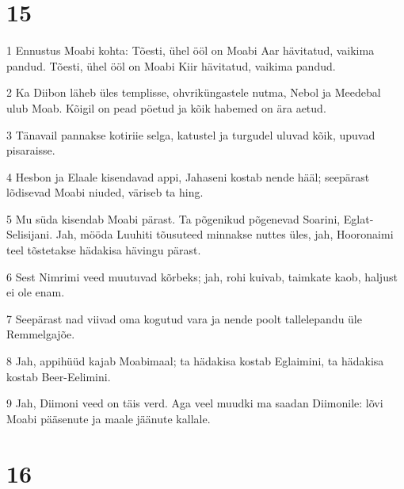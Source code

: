 \chapter{15}

\par 1 Ennustus Moabi kohta: Tõesti, ühel ööl on Moabi Aar hävitatud, vaikima pandud. Tõesti, ühel ööl on Moabi Kiir hävitatud, vaikima pandud.
\par 2 Ka Diibon läheb üles templisse, ohvriküngastele nutma, Nebol ja Meedebal ulub Moab. Kõigil on pead pöetud ja kõik habemed on ära aetud.
\par 3 Tänavail pannakse kotiriie selga, katustel ja turgudel uluvad kõik, upuvad pisaraisse.
\par 4 Hesbon ja Elaale kisendavad appi, Jahaseni kostab nende hääl; seepärast lõdisevad Moabi niuded, väriseb ta hing.
\par 5 Mu süda kisendab Moabi pärast. Ta põgenikud põgenevad Soarini, Eglat-Selisijani. Jah, mööda Luuhiti tõusuteed minnakse nuttes üles, jah, Hooronaimi teel tõstetakse hädakisa hävingu pärast.
\par 6 Sest Nimrimi veed muutuvad kõrbeks; jah, rohi kuivab, taimkate kaob, haljust ei ole enam.
\par 7 Seepärast nad viivad oma kogutud vara ja nende poolt tallelepandu üle Remmelgajõe.
\par 8 Jah, appihüüd kajab Moabimaal; ta hädakisa kostab Eglaimini, ta hädakisa kostab Beer-Eelimini.
\par 9 Jah, Diimoni veed on täis verd. Aga veel muudki ma saadan Diimonile: lõvi Moabi pääsenute ja maale jäänute kallale.

\chapter{16}

